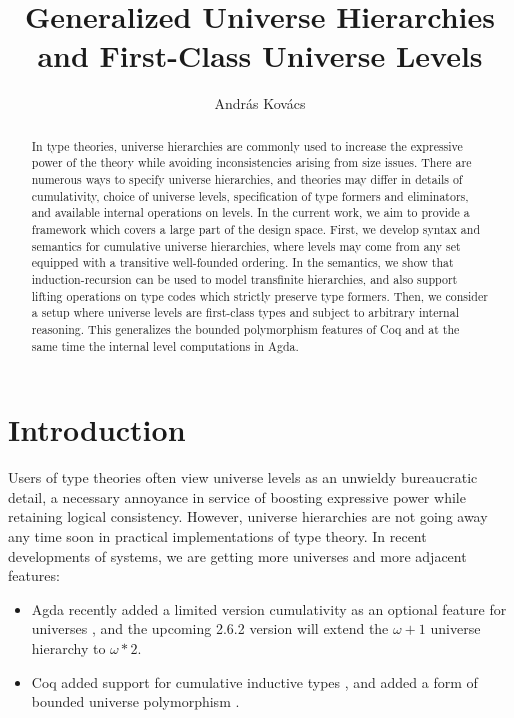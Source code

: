 \documentclass[a4paper,UKenglish,cleveref, autoref, thm-restate]{lipics-v2021}
\title{Generalized Universe Hierarchies and First-Class Universe Levels}
\author{András Kovács}{Eötvös Loránd University, Hungary}{kovacsandras@inf.elte.hu}{https://orcid.org/0000-0002-6375-9781}{}
\theoremstyle{remark}
\theoremstyle{definition}
\begin{document}
\maketitle

\begin{abstract}
In type theories, universe hierarchies are commonly used to increase the
expressive power of the theory while avoiding inconsistencies arising from size
issues. There are numerous ways to specify universe hierarchies, and theories
may differ in details of cumulativity, choice of universe levels, specification
of type formers and eliminators, and available internal operations on levels. In
the current work, we aim to provide a framework which covers a large part of the
design space. First, we develop syntax and semantics for cumulative universe
hierarchies, where levels may come from any set equipped with a transitive
well-founded ordering. In the semantics, we show that induction-recursion can be
used to model transfinite hierarchies, and also support lifting operations on
type codes which strictly preserve type formers. Then, we consider a setup where
universe levels are first-class types and subject to arbitrary internal
reasoning. This generalizes the bounded polymorphism features of Coq and at the
same time the internal level computations in Agda.
\end{abstract}

\section{Introduction}
\label{sec:introduction}

Users of type theories often view universe levels as an unwieldy bureaucratic
detail, a necessary annoyance in service of boosting expressive power while
retaining logical consistency. However, universe hierarchies are not going away
any time soon in practical implementations of type theory. In recent
developments of systems, we are getting more universes and more adjacent
features:

\begin{itemize}
\item Agda recently added a limited version cumulativity as an optional feature
  for universes \cite{agdadocs}, and the upcoming 2.6.2 version will extend the $\omega+1$
  universe hierarchy to $\omega*2$.
\item Coq added support for cumulative inductive types \cite{timany18cumulative}, and added a form of
  bounded universe polymorphism \cite{ziliani15unification}.
\end{itemize}
\end{document}
